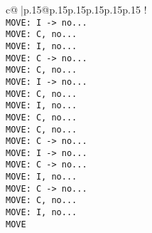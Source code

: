 \documentclass{article}
\begin{document}
{\begin{supertabular}{c@{$\;$}|p{.15\linewidth}@{}p{.15\linewidth}p{.15\linewidth}p{.15\linewidth}p{.15\linewidth}p{.15\linewidth}}
{{{!\\ \tt  MOVE: I -> no...\\ \tt  MOVE: C, no...\\ \tt  MOVE: I, no...\\ \tt  MOVE: C -> no...\\ \tt  MOVE: C, no...\\ \tt  MOVE: I -> no...\\ \tt  MOVE: C, no...\\ \tt  MOVE: I, no...\\ \tt  MOVE: C, no...\\ \tt  MOVE: C, no...\\ \tt  MOVE: C -> no...\\ \tt  MOVE: I -> no...\\ \tt  MOVE: C -> no...\\ \tt  MOVE: I, no...\\ \tt  MOVE: C -> no...\\ \tt  MOVE: C, no...\\ \tt  MOVE: I, no...\\ \tt  MOVE}}}
\end{supertabular}}
\end{document}
